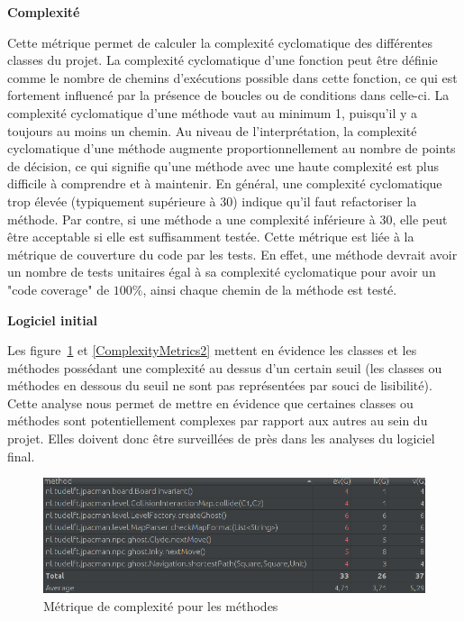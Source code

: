 \documentclass[12pt, openany]{report}
\begin{document}
\textbf{Complexité}


Cette métrique permet de calculer la complexité cyclomatique des différentes classes du projet. La complexité cyclomatique d'une fonction peut être définie comme le nombre de chemins d'exécutions possible dans cette fonction, ce qui est fortement influencé par la présence de boucles ou de conditions dans celle-ci. La complexité cyclomatique d'une méthode vaut au minimum 1, puisqu'il y a toujours au moins un chemin. Au niveau de l'interprétation, la complexité cyclomatique d'une méthode augmente proportionnellement au nombre de points de décision, ce qui signifie qu'une méthode avec une haute complexité est plus difficile à comprendre et à maintenir. En général, une complexité cyclomatique trop élevée (typiquement supérieure à 30) indique qu'il faut refactoriser la méthode. Par contre, si une méthode a une complexité inférieure à 30, elle peut être acceptable si elle est suffisamment testée. Cette métrique est liée à la métrique de couverture du code par les tests. En effet, une méthode devrait avoir un nombre de tests unitaires égal à sa complexité cyclomatique pour avoir un "code coverage" de $100\%$, ainsi chaque chemin de la méthode est testé.

\textbf{Logiciel initial}

Les figure~\ref{ComplexityMetrics1} et \ref{ComplexityMetrics2}  mettent en évidence les classes et les méthodes possédant une complexité au dessus d'un certain seuil (les classes ou méthodes en dessous du seuil ne sont pas représentées par souci de lisibilité). Cette analyse nous permet de mettre en évidence que certaines classes ou méthodes sont potentiellement complexes par rapport aux autres au sein du projet. Elles doivent donc être surveillées de près dans les analyses du logiciel final.


\begin{figure}[!h]
	\centering
	\includegraphics[scale=0.6]{Images/ComplexityMetrics1.png} 
	\caption{Métrique de complexité pour les méthodes}
	\label{ComplexityMetrics1}
\end{figure}
\end{document}
